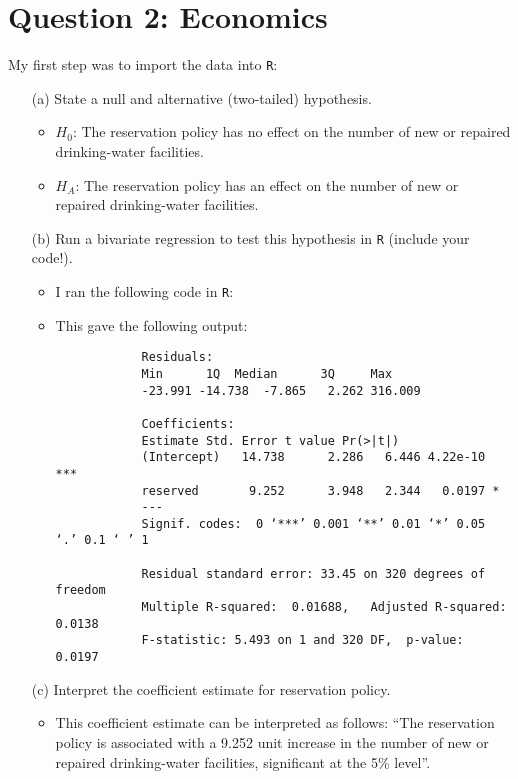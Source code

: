 \documentclass[12pt,letterpaper]{article}
\begin{document}
	\section*{Question 2: Economics}
	
	\vspace{.25cm}
	
	My first step was to import the data into \texttt{R}: 
	
	\vspace{.5cm}
	
	\begin{enumerate}
		\item [(a)] State a null and alternative (two-tailed) hypothesis. 
		
		\begin{itemize}
			\item $H_{0}$: The reservation policy has no effect on the number of new or repaired drinking-water facilities.
			\item $H_{A}$: The reservation policy has an effect on the number of new or repaired drinking-water facilities.
		\end{itemize}
		
		\vspace{1cm}
		
		\item [(b)] Run a bivariate regression to test this hypothesis in \texttt{R} (include your code!).
		
		\begin{itemize}
			\item I ran the following code in \texttt{R}: 
			\item This gave the following output: \begin{verbatim} 
			Residuals:
			Min      1Q  Median      3Q     Max 
			-23.991 -14.738  -7.865   2.262 316.009 
			
			Coefficients:
			Estimate Std. Error t value Pr(>|t|)    
			(Intercept)   14.738      2.286   6.446 4.22e-10 ***
			reserved       9.252      3.948   2.344   0.0197 *  
			---
			Signif. codes:  0 ‘***’ 0.001 ‘**’ 0.01 ‘*’ 0.05 ‘.’ 0.1 ‘ ’ 1
			
			Residual standard error: 33.45 on 320 degrees of freedom
			Multiple R-squared:  0.01688,	Adjusted R-squared:  0.0138 
			F-statistic: 5.493 on 1 and 320 DF,  p-value: 0.0197
			\end{verbatim}
		\end{itemize}
		
		\newpage
		
		\item [(c)] Interpret the coefficient estimate for reservation policy.
		
		\begin{itemize}
			\item This coefficient estimate can be interpreted as follows: ``The reservation policy is associated with a 9.252 unit increase in the number of new or repaired drinking-water facilities, significant at the 5\% level''.
		\end{itemize}
		
	\end{enumerate}
	
\end{document}
